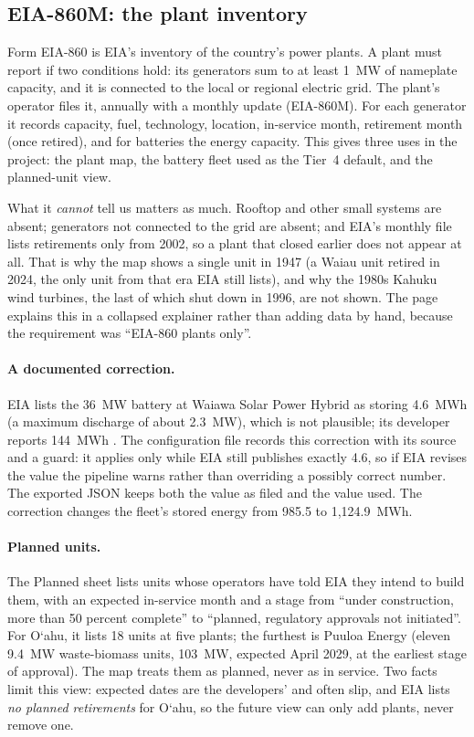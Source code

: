 \documentclass[11pt,a4paper]{article}
\newcommand{\okina}{\textquoteleft}
\newcommand{\Oahu}{\texorpdfstring{O\okina ahu}{Oahu}}
\begin{document}
\subsection{EIA-860M: the plant inventory}
Form EIA-860 \cite{eia860} is EIA's inventory of the country's power plants. A plant must report if two conditions hold:
its generators sum to at least 1~MW of nameplate capacity, and it is connected to the local or regional electric
grid. The plant's operator files it, annually with a monthly update (EIA-860M). For each generator it records
capacity, fuel, technology, location, in-service month, retirement month (once retired), and for batteries the
energy capacity. This gives three uses in the project: the plant map, the battery fleet used as the Tier~4
default, and the planned-unit view.

What it \emph{cannot} tell us matters as much. Rooftop and other small systems are absent; generators not
connected to the grid are absent; and EIA's monthly file lists retirements only from 2002, so a plant that closed
earlier does not appear at all. That is why the map shows a single unit in 1947 (a Waiau unit retired in 2024,
the only unit from that era EIA still lists), and why the 1980s Kahuku wind turbines, the last of which shut down in
1996, are not shown. The page explains this in a collapsed explainer rather than adding data by hand, because the
requirement was ``EIA-860 plants only''.

\paragraph{A documented correction.} EIA lists the 36~MW battery at Waiawa Solar Power Hybrid as storing 4.6~MWh
(a maximum discharge of about 2.3~MW), which is not plausible; its developer reports 144~MWh
\cite{clearway}. The configuration file records this correction with its source and a guard: it applies only while
EIA still publishes exactly 4.6, so if EIA revises the value the pipeline warns rather than overriding a
possibly correct number. The exported JSON keeps both the value as filed and the value used. The correction
changes the fleet's stored energy from 985.5 to 1,124.9~MWh.

\paragraph{Planned units.} The Planned sheet lists units whose operators have told EIA they intend to build them,
with an expected in-service month and a stage from ``under construction, more than 50 percent complete'' to
``planned, regulatory approvals not initiated''. For \Oahu, it lists 18 units at five plants; the furthest is
Puuloa Energy (eleven 9.4~MW waste-biomass units, 103~MW, expected April 2029, at the earliest stage of
approval). The map treats them as planned, never as in service. Two facts limit this view: expected dates are
the developers' and often slip, and EIA lists \emph{no planned retirements} for \Oahu, so the future view can only
add plants, never remove one.
\end{document}
